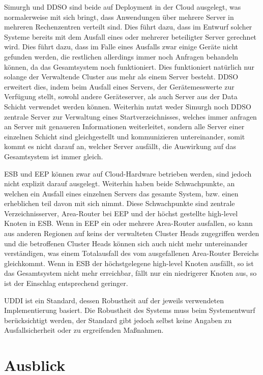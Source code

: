 \documentclass[conference,compsoc]{IEEEtran}
\begin{document}
Simurgh und DDSO sind beide auf Deployment in der Cloud ausgelegt, was normalerweise mit sich bringt, dass Anwendungen über mehrere Server in mehreren Rechenzentren verteilt sind. Dies führt dazu, dass im Entwurf solcher Systeme bereits mit dem Ausfall eines oder mehrerer beteiligter Server gerechnet wird. Dies führt dazu, dass im Falle eines Ausfalls zwar einige Geräte nicht gefunden werden, die restlichen allerdings immer noch Anfragen behandeln können, da das Gesamtsystem noch funktioniert. Dies funktioniert natürlich nur solange der Verwaltende Cluster aus mehr als einem Server besteht. DDSO erweitert dies, indem beim Ausfall eines Servers, der Gerätemesswerte zur Verfügung stellt, sowohl andere Geräteserver, als auch Server aus der Data Schicht verwendet werden können. Weiterhin nutzt weder Simurgh noch DDSO zentrale Server zur Verwaltung eines Startverzeichnisses, welches immer anfragen an Server mit genaueren Informationen weiterleitet, sondern alle Server einer einzelnen Schicht sind gleichgestellt und kommunizieren untereinander, somit kommt es nicht darauf an, welcher Server ausfällt, die Auswirkung auf das Gesamtsystem ist immer gleich.

ESB und EEP können zwar auf Cloud-Hardware betrieben werden, sind jedoch nicht explizit darauf ausgelegt. Weiterhin haben beide Schwachpunkte, an welchen ein Ausfall eines einzelnen Servers das gesamte System, bzw. einen erheblichen teil davon mit sich nimmt. Diese Schwachpunkte sind zentrale Verzeichnisserver, Area-Router bei EEP und der höchst gestellte high-level Knoten in ESB. Wenn in EEP ein oder mehrere Area-Router ausfallen, so kann aus anderen Regionen auf keins der verwalteten Cluster Heads zugegriffen werden und die betroffenen Cluster Heads können sich auch nicht mehr untereinander verständigen, was einem Totalausfall des vom ausgefallenen Area-Router Bereichs gleichkommt. Wenn in ESB der höchstgelegene high-level Knoten ausfällt, so ist das Gesamtsystem nicht mehr erreichbar, fällt nur ein niedrigerer Knoten aus, so ist der Einschlag entsprechend geringer.

UDDI ist ein Standard, dessen Robustheit auf der jeweils verwendeten Implementierung basiert. Die Robustheit des Systems muss beim Systementwurf berücksichtigt werden, der Standard gibt jedoch selbst keine Angaben zu Ausfallsicherheit oder zu ergreifenden Maßnahmen.

\section{Ausblick}
\end{document}
